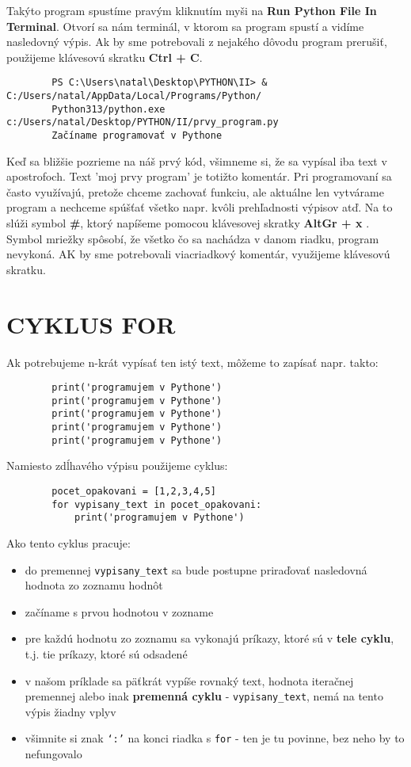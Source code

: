 \documentclass[a4paper,11pt]{report}
\begin{document}
	Takýto program spustíme pravým kliknutím myši na \textbf{Run Python File In Terminal}. Otvorí sa nám terminál, v ktorom sa program spustí a vidíme nasledovný výpis. Ak by sme potrebovali z nejakého dôvodu program prerušiť, použijeme klávesovú skratku \textbf{Ctrl + C}. 

	\begin{verbatim}
		PS C:\Users\natal\Desktop\PYTHON\II> & C:/Users/natal/AppData/Local/Programs/Python/
		Python313/python.exe c:/Users/natal/Desktop/PYTHON/II/prvy_program.py
		Začíname programovať v Pythone
	\end{verbatim}
	
	Keď sa bližšie pozrieme na náš prvý kód, všimneme si, že sa vypísal iba text v apostrofoch. Text 'moj prvy program' je totižto komentár. Pri programovaní sa často využívajú, pretože chceme zachovať funkciu, ale aktuálne len vytvárame program a nechceme spúšťať všetko napr. kvôli prehľadnosti výpisov atď. Na to slúži symbol \textbf{\#}, ktorý napíšeme pomocou klávesovej skratky \textbf{AltGr + x }. Symbol mriežky spôsobí, že všetko čo sa nachádza v danom riadku, program nevykoná. AK by sme potrebovali viacriadkový komentár, využijeme klávesovú skratku. 
	
	\chapter{CYKLUS FOR}
	
	Ak potrebujeme n-krát vypísať ten istý text, môžeme to zapísať napr. takto:
	
	\begin{verbatim}
		print('programujem v Pythone')
		print('programujem v Pythone')
		print('programujem v Pythone')
		print('programujem v Pythone')
		print('programujem v Pythone')
	\end{verbatim}
	
	\noindent Namiesto zdĺhavého výpisu použijeme cyklus: 
	\begin{verbatim}
		pocet_opakovani = [1,2,3,4,5]
		for vypisany_text in pocet_opakovani:
		    print('programujem v Pythone')
	\end{verbatim}
	
	\noindent Ako tento cyklus pracuje:
	\begin{itemize}
		\item do premennej \texttt{vypisany\_text} sa bude postupne priraďovať nasledovná hodnota zo zoznamu hodnôt
		\item začíname s prvou hodnotou v zozname
		\item pre každú hodnotu zo zoznamu sa vykonajú príkazy, ktoré sú v \textbf{tele cyklu}, t.j. tie príkazy, ktoré sú odsadené
		\item v našom príklade sa päťkrát vypíše rovnaký text, hodnota iteračnej premennej alebo inak \textbf{premenná cyklu} - \texttt{vypisany\_text}, nemá
		na tento výpis žiadny vplyv
		\item všimnite si znak \texttt{‘:’} na konci riadka s \texttt{for} - ten je tu povinne, bez neho by to nefungovalo
	\end{itemize}
	
\end{document}

